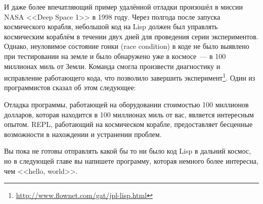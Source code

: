 И даже более впечатляющий пример удалённой отладки произошёл в миссии NASA <<Deep Space 1>>
в 1998 году. Через полгода после запуска космического корабля, небольшой код на Lisp
должен был управлять космическим кораблём в течении двух дней для проведения серии
экспериментов. Однако, неуловимое состояние гонки (race condition) в коде не было выявлено
при тестировании на земле и было обнаружено уже в космосе~--- в 100 миллионах миль от Земли.
Команда смогла произвести диагностику и исправление работающего кода, что позволило завершить
эксперимент\footnote{\url{http://www.flownet.com/gat/jpl-lisp.html}}. Один из
программистов сказал об этом следующее:

Отладка программы, работающей на оборудовании стоимостью 100 миллионов долларов, которая
находится в 100 миллионах миль от вас, является интересным опытом. REPL, работающий на
космическом корабле, предоставляет бесценные возможности в нахождении и устранении
проблем.

Вы пока не готовы отправлять какой бы то ни было код Lisp в дальний космос, но в следующей
главе вы напишете программу, которая немного более интересна, чем <<hello, world>>.

